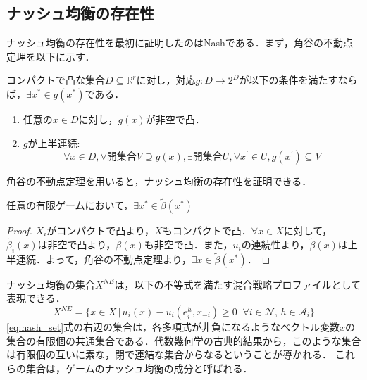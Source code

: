 \documentclass{jsreport}
\begin{document}
\subsection{ナッシュ均衡の存在性}
ナッシュ均衡の存在性を最初に証明したのはNashである．まず，角谷の不動点定理を以下に示す．
\begin{screen}
  \begin{theo}[角谷の不動点定理]
    コンパクトで凸な集合$D \subseteq \mathbb{R}^r$に対し，対応$g:D \to 2^D$が以下の条件を満たすならば，$\exists x^{*} \in g(x^{*})$である．
    \begin{enumerate}
      \item 任意の$x \in D$に対し，$g(x)$が非空で凸．
      \item $g$が上半連続:
      \begin{equation}
        \forall x \in D, \forall 開集合 V \supseteq g(x), \exists 開集合 U, \forall x^{\prime} \in U, g(x^{\prime}) \subseteq V \nonumber
      \end{equation}
    \end{enumerate}
  \end{theo}
\end{screen}

角谷の不動点定理を用いると，ナッシュ均衡の存在性を証明できる．
\begin{screen}
  \begin{theo}
    任意の有限ゲームにおいて，$\exists x^{*} \in \tilde{\beta}(x^{*})$
  \end{theo}
\end{screen}

\begin{proof}
  $X_i$がコンパクトで凸より，$X$もコンパクトで凸．$\forall x \in X$に対して，$\tilde{\beta}_i(x)$は非空で凸より，$\tilde{\beta}(x)$も非空で凸．また，$u_i$の連続性より，$\tilde{\beta}(x)$は上半連続．よって，角谷の不動点定理より，$\exists x \in \tilde{\beta}(x^{*})$．
\end{proof}

ナッシュ均衡の集合$X^{NE}$は，以下の不等式を満たす混合戦略プロファイルとして表現できる．
\begin{equation}
  X^{NE} = \{x \in X \, | \, u_i(x) - u_i(e_i^h, x_{-i}) \geq 0 \; \; \forall i \in \mathcal{N}, \, h \in \mathcal{A}_i\} \label{eq:nash_set}
\end{equation}
\eqref{eq:nash_set}式の右辺の集合は，各多項式が非負になるようなベクトル変数$x$の集合の有限個の共通集合である．代数幾何学の古典的結果から，このような集合は有限個の互いに素な，閉で連結な集合からなるということが導かれる．
これらの集合は，ゲームのナッシュ均衡の成分と呼ばれる．
\end{document}
